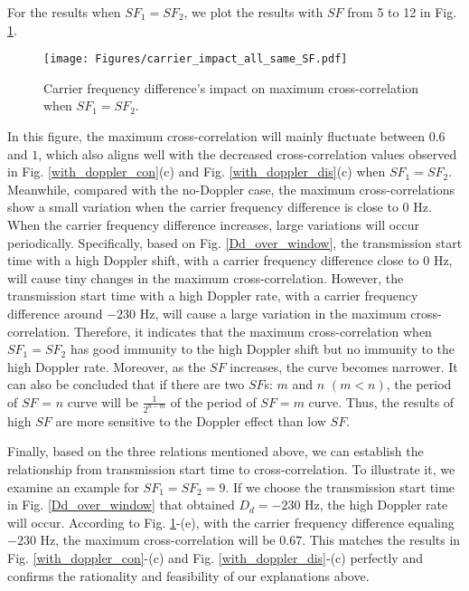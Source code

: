 \documentclass{IEEEtaes}
\theoremstyle{plain}
\begin{document}
For the results when $SF_1 = SF_2$, we plot the results with $SF$ from 5 to 12 in Fig. \ref{carrier_impact_all_same_SF}.
\begin{figure}[ht]
  \centering
  \texttt{[image: Figures/carrier\_impact\_all\_same\_SF.pdf]}
  \caption{Carrier frequency difference’s impact on maximum cross-correlation when $SF_1 = SF_2$.}
  \label{carrier_impact_all_same_SF}
\end{figure}
In this figure, the maximum cross-correlation will mainly fluctuate between $0.6$ and $1$, which also aligns well with the decreased cross-correlation values observed in Fig. \ref{with_doppler_con}(c) and  Fig. \ref{with_doppler_dis}(c) when $SF_1 = SF_2$. Meanwhile, compared with the no-Doppler case, the maximum cross-correlations show a small variation when the carrier frequency difference is close to $0$ Hz. When the carrier frequency difference increases, large variations will occur periodically. Specifically, based on Fig. \ref{Dd_over_window}, the transmission start time with a high Doppler shift, with a carrier frequency difference close to $0$ Hz, will cause tiny changes in the maximum cross-correlation. However, the transmission start time with a high Doppler rate, with a carrier frequency difference around $-230$ Hz, will cause a large variation in the maximum cross-correlation. Therefore, it indicates that the maximum cross-correlation when $SF_1 = SF_2$ has good immunity to the high Doppler shift but no immunity to the high Doppler rate. Moreover, as the $SF$ increases, the curve becomes narrower. It can also be concluded that if there are two $SF$s: $m$ and $n$ $(m<n)$, the period of $SF$ = $n$ curve will be $\frac{1}{2^{n-m}}$ of the period of $SF = m$ curve. Thus, the results of high $SF$ are more sensitive to the Doppler effect than low $SF$.

Finally, based on the three relations mentioned above, we can establish the relationship from transmission start time to cross-correlation. To illustrate it, we examine an example for $SF_1 = SF_2 = 9$. 
If we choose the transmission start time in Fig. \ref{Dd_over_window} that obtained $D_d=-230$ Hz, the high Doppler rate will occur. 
According to Fig. \ref{carrier_impact_all_same_SF}-(e), with the carrier frequency difference equaling $-230$ Hz, the maximum cross-correlation will be $0.67$. This matches the results in Fig. \ref{with_doppler_con}-(c) and  Fig. \ref{with_doppler_dis}-(c) perfectly and confirms the rationality and feasibility of our explanations above.
\end{document}
